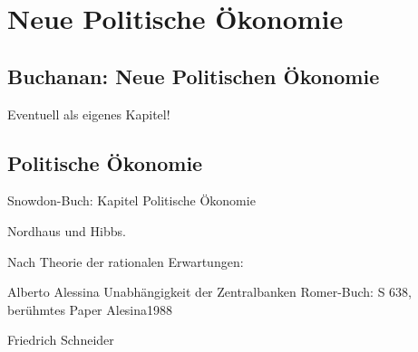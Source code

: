 %
%
%

\chapter{Neue Politische Ökonomie}
\label{Neue_Politik}




\section{Buchanan: Neue Politischen Ökonomie}
\label{Pol_Econ}

Eventuell als eigenes Kapitel!


\section{Politische Ökonomie}
Snowdon-Buch: Kapitel Politische Ökonomie

Nordhaus und Hibbs.

Nach Theorie der rationalen Erwartungen:

Alberto Alessina
Unabhängigkeit der Zentralbanken Romer-Buch: S 638, berühmtes Paper Alesina1988

Friedrich Schneider
